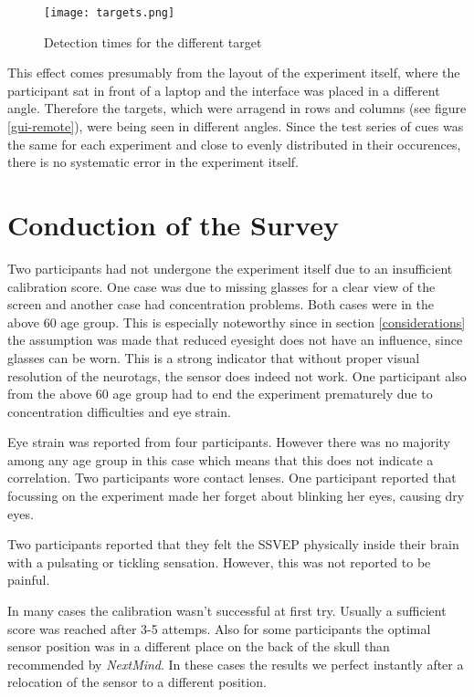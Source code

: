             \begin{figure}[h]     %
                \centering
                \texttt{[image: targets.png]} 
                \caption{Detection times for the different target}\label{targets}
            \end{figure}

            This effect comes presumably from the layout of the experiment itself, where the participant sat in front of a laptop and the interface was placed in a different angle. Therefore the targets, which were arragend in rows and columns (see figure \ref*{gui-remote}), were being seen in different angles. Since the test series of cues was the same for each experiment and close to evenly distributed in their occurences, there is no systematic error in the experiment itself.
            
        \section{Conduction of the Survey}
            
            Two participants had not undergone the experiment itself due to an insufficient calibration score. One case was due to missing glasses for a clear view of the screen and another case had concentration problems. Both cases were in the above 60 age group. This is especially noteworthy since in section \ref*{considerations} the assumption was made that reduced eyesight does not have an influence, since glasses can be worn. This is a strong indicator that without proper visual resolution of the neurotags, the sensor does indeed not work.
            One participant also from the above 60 age group had to end the experiment prematurely due to concentration difficulties and eye strain.

            Eye strain was reported from four participants. However there was no majority among any age group in this case which means that this does not indicate a correlation. Two participants wore contact lenses. One participant reported that focussing on the experiment made her forget about blinking her eyes, causing dry eyes.

            Two participants reported that they felt the SSVEP physically inside their brain with a pulsating or tickling sensation. However, this was not reported to be painful.

            In many cases the calibration wasn't successful at first try. Usually a sufficient score was reached after 3-5 attemps. Also for some participants the optimal sensor position was in a different place on the back of the skull than recommended by \textit{NextMind}. In these cases the results we perfect instantly after a relocation of the sensor to a different position.

